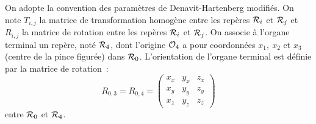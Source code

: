 \documentclass[12pt,a4paper]{article}
\begin{document}
  On adopte la convention des paramètres de
  Denavit-Hartenberg modifiés. On note $T_{i,j}$ la matrice de transformation homogène
  entre les repères ${\cal R}_i$ et ${\cal R}_j$  et $R_{i,j}$ la matrice de
  rotation entre les repères ${\cal R}_i$ et ${\cal R}_j$.  On associe à l'organe terminal un repère, noté ${\cal R}_4$, dont l'origine ${\cal O}_4$ a pour coordonnées  $x_1, \ x_2 $
  et $x_3$  (centre de la pince figurée) dans
  ${\cal R}_0$. L'orientation de l'organe terminal est définie par la
  matrice de rotation~:
  \begin{equation*}
    R_{0,3}=R_{0,4}=
    \begin{pmatrix}
      x_{x} & y_{x} & z_{x} \\
      x_{y} & y_{y} & z_{y} \\
      x_{z} & y_{z} & z_{z}
    \end{pmatrix}
  \end{equation*}
  entre ${\cal R}_0$ et ${\cal R}_4$.
  
\end{document}
